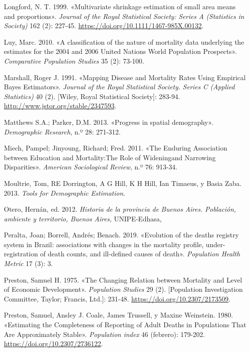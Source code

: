 \documentclass[12pt,spanish,]{article}
\begin{document}
\leavevmode\hypertarget{ref-Longford1999}{}%
Longford, N. T. 1999. «Multivariate shrinkage estimation of small area
means and proportions». \emph{Journal of the Royal Statistical Society:
Series A (Statistics in Society)} 162 (2): 227-45.
\url{https://doi.org/10.1111/1467-985X.00132}.

\leavevmode\hypertarget{ref-Luy2010}{}%
Luy, Marc. 2010. «A classification of the nature of mortality data
underlying the estimates for the 2004 and 2006 United Nations World
Population Prospects». \emph{Comparative Population Studies} 35 (2):
73-100.

\leavevmode\hypertarget{ref-Marshall1991}{}%
Marshall, Roger J. 1991. «Mapping Disease and Mortality Rates Using
Empirical Bayes Estimators». \emph{Journal of the Royal Statistical
Society. Series C (Applied Statistics)} 40 (2). {[}Wiley, Royal
Statistical Society{]}: 283-94.
\url{http://www.jstor.org/stable/2347593}.

\leavevmode\hypertarget{ref-Matthews2013}{}%
Matthews S.A.; Parker, D.M. 2013. «Progress in spatial demography».
\emph{Demographic Research}, n.º 28: 271-312.

\leavevmode\hypertarget{ref-Miech2011}{}%
Miech, Pampel; Jinyoung, Richard; Fred. 2011. «The Enduring Association
between Education and Mortality:The Role of Wideningand Narrowing
Disparities». \emph{American Sociological Review}, n.º 76: 913-34.

\leavevmode\hypertarget{ref-Moultrie}{}%
Moultrie, Tom, RE Dorrington, A G Hill, K H Hill, Ian Timaeus, y Basia
Zaba. 2013. \emph{Tools for Demographic Estimation}.

\leavevmode\hypertarget{ref-Otero2012}{}%
Otero, Hernán, ed. 2012. \emph{Historia de la provincia de Buenos Aires.
Población, ambiente y territorio, Buenos Aires,} UNIPE-Edhasa,

\leavevmode\hypertarget{ref-Peralta2019}{}%
Peralta, Joan; Borrell, Andrés; Benach. 2019. «Evolution of the deaths
registry system in Brazil: associations with changes in the mortality
profile, under-registration of death counts, and ill-defined causes of
death». \emph{Population Health Metric} 17 (3): 3.

\leavevmode\hypertarget{ref-Preston1975}{}%
Preston, Samuel H. 1975. «The Changing Relation between Mortality and
Level of Economic Development». \emph{Population Studies} 29 (2).
{[}Population Investigation Committee, Taylor; Francis, Ltd.{]}: 231-48.
\url{https://doi.org/10.2307/2173509}.

\leavevmode\hypertarget{ref-Preston1980}{}%
Preston, Samuel, Ansley J. Coale, James Trussell, y Maxine Weinstein.
1980. «Estimating the Completeness of Reporting of Adult Deaths in
Populations That Are Approximately Stable». \emph{Population index} 46
(febrero): 179-202. \url{https://doi.org/10.2307/2736122}.
\end{document}
